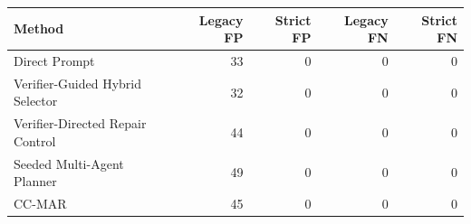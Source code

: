 \begin{tabular}{@{}lrrrr@{}}
\toprule
Method & Legacy FP & Strict FP & Legacy FN & Strict FN \\
\midrule
Direct Prompt & 33 & 0 & 0 & 0 \\
Verifier-Guided Hybrid Selector & 32 & 0 & 0 & 0 \\
Verifier-Directed Repair Control & 44 & 0 & 0 & 0 \\
Seeded Multi-Agent Planner & 49 & 0 & 0 & 0 \\
CC-MAR & 45 & 0 & 0 & 0 \\
\bottomrule
\end{tabular}
